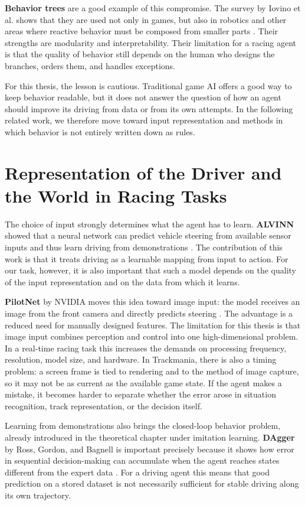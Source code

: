 \textbf{Behavior trees} are a good example of this compromise. The survey by Iovino et al. shows that they are used not only in games, but also in robotics and other areas where reactive behavior must be composed from smaller parts \cite{iovino2022behavior_trees}. Their strengths are modularity and interpretability. Their limitation for a racing agent is that the quality of behavior still depends on the human who designs the branches, orders them, and handles exceptions.

For this thesis, the lesson is cautious. Traditional game AI offers a good way to keep behavior readable, but it does not answer the question of how an agent should improve its driving from data or from its own attempts. In the following related work, we therefore move toward input representation and methods in which behavior is not entirely written down as rules.

\section{Representation of the Driver and the World in Racing Tasks}

The choice of input strongly determines what the agent has to learn. \textbf{ALVINN} showed that a neural network can predict vehicle steering from available sensor inputs and thus learn driving from demonstrations \cite{pomerleau1989alvinn}. The contribution of this work is that it treats driving as a learnable mapping from input to action. For our task, however, it is also important that such a model depends on the quality of the input representation and on the data from which it learns.

\textbf{PilotNet} by NVIDIA moves this idea toward image input: the model receives an image from the front camera and directly predicts steering \cite{bojarski2016endtoend}. The advantage is a reduced need for manually designed features. The limitation for this thesis is that image input combines perception and control into one high-dimensional problem. In a real-time racing task this increases the demands on processing frequency, resolution, model size, and hardware. In Trackmania, there is also a timing problem: a screen frame is tied to rendering and to the method of image capture, so it may not be as current as the available game state. If the agent makes a mistake, it becomes harder to separate whether the error arose in situation recognition, track representation, or the decision itself.

Learning from demonstrations also brings the closed-loop behavior problem, already introduced in the theoretical chapter under imitation learning. \textbf{DAgger} by Ross, Gordon, and Bagnell is important precisely because it shows how error in sequential decision-making can accumulate when the agent reaches states different from the expert data \cite{ross2011dagger}. For a driving agent this means that good prediction on a stored dataset is not necessarily sufficient for stable driving along its own trajectory.


